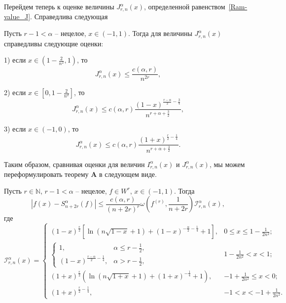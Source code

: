 Перейдем теперь к оценке величины $J_{r,n}^\alpha(x)$, определенной равенством~\eqref{Ram-value_J}. Справедлива следующая

\begin{theorem}\label{Ram-theo2}
	Пусть $r-1<\alpha$ -- нецелое, $x\in(-1,1)$. Тогда для величины $J_{r,n}^\alpha(x)$ справедливы следующие оценки:
	
	1) если $x\in\left(1-\frac{2}{n^2},1\right)$, то
	\begin{equation*}\label{est_for_J1_seg}
		J_{r,n}^\alpha(x)\le \frac{c(\alpha,r)}{n^{2r}},
	\end{equation*}
	
	2) если $x\in\left[0,1-\frac{2}{n^2}\right]$, то
	\begin{equation*}
		J_{r,n}^\alpha(x)\le c(\alpha,r)\frac{(1-x)^{\frac{r-\alpha}{2}-\frac34}}{n^{r+\alpha+\frac32}},
	\end{equation*}
	
	3) если $x\in(-1,0)$, то
	\begin{equation*}
		J_{r,n}^\alpha(x)\le c(\alpha,r)\frac{(1+x)^{\frac{r}{2}-\frac14}}{n^{r+\alpha+\frac32}}.
	\end{equation*}
\end{theorem}

Таким образом, сравнивая оценки для величин $I_{r,n}^\alpha(x)$ и $J_{r,n}^\alpha(x)$, мы можем переформулировать теорему {\textbf{A}} в следующем виде.
\begin{theorem}\label{Ram-theo3}
Пусть $r\in\mathbb{N}$, $r-1<\alpha$ -- нецелое, $f\in W^r$, $x\in(-1,1)$. Тогда
\begin{equation*}
|f(x)-S^\alpha_{n+2r}(f)|\le \frac{c(\alpha,r)}{(n+2r)^r}\omega\left(f^{(r)},\frac{1}{n+2r}\right)\mathcal{I}_{r,n}^\alpha(x),
\end{equation*}
где
$$
\mathcal{I}_{r,n}^\alpha(x)=
\begin{cases}
     (1-x)^{\frac{r}{2}}\left[\ln(n\sqrt{1-x}+1)+(1-x)^{-\frac{\alpha}{2}-\frac14}+1\right], & 0\le x\le 1-\frac{1}{2n^2}; \\
     \begin{cases}
	       1, & \alpha\le r-\frac12, \\
	       (1-x)^{\frac{r-\alpha}{2}-\frac14}, & \alpha>r-\frac12,
     \end{cases} & 1-\frac{1}{2n^2}<x<1;\\
    (1+x)^{\frac{r}{2}}\left(\ln(n\sqrt{1+x}+1)+(1+x)^{-\frac14}+1\right), & -1+\frac{1}{2n^2}\le x<0; \\
    (1+x)^{\frac{r}{2}-\frac14}, & -1<x<-1+\frac{1}{2n^2}.
\end{cases}
$$
\end{theorem}

